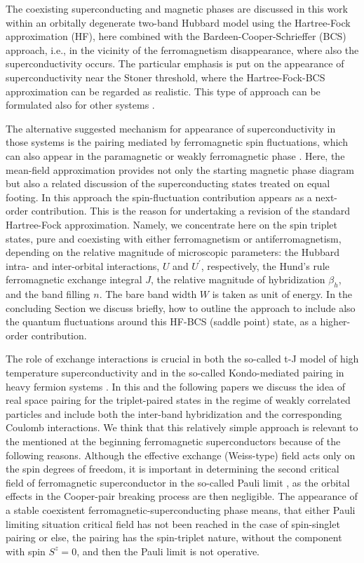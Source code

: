 \documentclass[aps,prb,showpacs,reprint]{revtex4-1}
\begin{document}
The coexisting superconducting
and magnetic phases are discussed in this work within an orbitally degenerate two-band
Hubbard model using the Hartree-Fock approximation (HF), here
combined with the Bardeen-Cooper-Schrieffer (BCS) approach, i.e., in the
vicinity of the ferromagnetism disappearance, where also the superconductivity
occurs. The particular emphasis is put on the appearance of superconductivity
near the Stoner threshold, where the Hartree-Fock-BCS approximation can be
regarded as realistic. This type of approach can be formulated also for other
systems \cite{Puetter2003}.

The alternative suggested mechanism
for appearance of superconductivity in those systems is the pairing mediated by ferromagnetic
spin fluctuations, which can also appear in the paramagnetic or weakly ferromagnetic
phase \cite{Anderson}. Here, the mean-field approximation provides not only the starting
magnetic phase diagram but also a related discussion of the
superconducting states treated on equal footing. In this approach the spin-fluctuation contribution appears as a next-order contribution. This is the reason for undertaking a revision of the standard Hartree-Fock approximation. Namely, we concentrate here on the spin triplet states, pure
and coexisting with either ferromagnetism or antiferromagnetism, depending on the relative
magnitude of microscopic parameters: the Hubbard intra- and inter-orbital interactions, $U$ and $U^{\prime}$, respectively, the Hund's rule
ferromagnetic exchange integral $J$, the relative magnitude of hybridization
$\beta_h$, and the band filling $n$. The bare band width $W$ is taken as unit of
energy. In the concluding Section we discuss briefly, how to outline 
the approach to include also the quantum fluctuations around this
HF-BCS (saddle point) state, as a higher-order contribution.

The role of exchange interactions is crucial in both the so-called t-J model of
high temperature superconductivity \cite{Spalek1988(2)} and in the so-called Kondo-mediated
pairing in heavy fermion systems \cite{Spalek1988}. In this and the following papers we discuss the idea of real space pairing for the triplet-paired states in the regime of weakly correlated particles and include both the inter-band hybridization and the corresponding Coulomb interactions. We think
that this relatively simple approach is relevant to the mentioned at the
beginning ferromagnetic superconductors because of the following reasons.
Although the effective exchange (Weiss-type) field acts only on the
spin degrees of freedom, it is important in determining the second critical
field of ferromagnetic superconductor in the so-called Pauli limit \cite{Clagton}, as the
orbital effects in the Cooper-pair breaking process are then negligible. The
appearance of a stable coexistent ferromagnetic-superconducting phase means, that
either Pauli limiting situation critical field has not been reached in the case of
spin-singlet pairing or else, the pairing has the spin-triplet nature, without
the component with spin $S^z=0$, and then the Pauli limit is not operative. 
\end{document}
